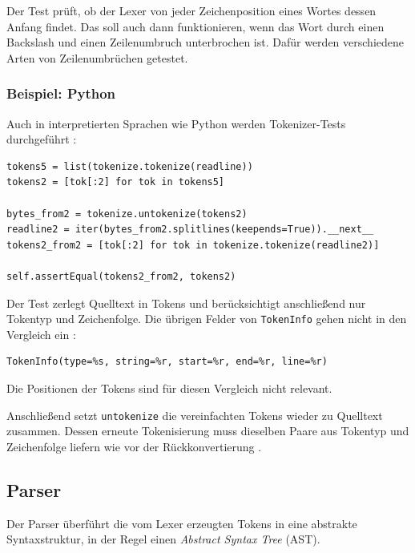 \documentclass[11pt,a4paper]{article}
\begin{document}
Der Test \parencite{llvm_lexer_test} prüft, ob der Lexer von jeder Zeichenposition eines Wortes dessen Anfang findet. Das soll auch dann funktionieren, wenn das Wort durch einen Backslash und einen Zeilenumbruch unterbrochen ist. Dafür werden verschiedene Arten von Zeilenumbrüchen getestet.

\subsubsection{Beispiel: Python}

Auch in interpretierten Sprachen wie Python werden Tokenizer-Tests durchgeführt \parencite{python_test_tokenizer}:

\begin{lstlisting}[caption={Auszug aus dem Python-Test zur erneuten Tokenisierung}]
tokens5 = list(tokenize.tokenize(readline))
tokens2 = [tok[:2] for tok in tokens5]

bytes_from2 = tokenize.untokenize(tokens2)
readline2 = iter(bytes_from2.splitlines(keepends=True)).__next__
tokens2_from2 = [tok[:2] for tok in tokenize.tokenize(readline2)]

self.assertEqual(tokens2_from2, tokens2)
\end{lstlisting}

Der Test zerlegt Quelltext in Tokens und berücksichtigt anschließend nur Tokentyp und Zeichenfolge. Die übrigen Felder von \texttt{TokenInfo} gehen nicht in den Vergleich ein \parencite{python_tokenizer}:

\begin{lstlisting}[caption={Darstellung der Felder von TokenInfo}]
TokenInfo(type=%s, string=%r, start=%r, end=%r, line=%r)
\end{lstlisting}

Die Positionen der Tokens sind für diesen Vergleich nicht relevant.

Anschließend setzt \texttt{untokenize} die vereinfachten Tokens wieder zu Quelltext zusammen. Dessen erneute Tokenisierung muss dieselben Paare aus Tokentyp und Zeichenfolge liefern wie vor der Rückkonvertierung \parencite{python_test_tokenizer}.


\subsection{Parser}

Der Parser überführt die vom Lexer erzeugten Tokens in eine abstrakte Syntaxstruktur, in der Regel einen \emph{Abstract Syntax Tree} (AST). 
\end{document}
